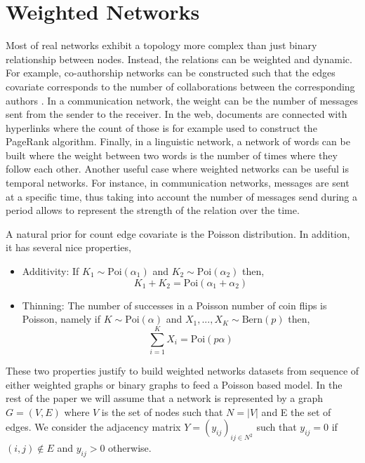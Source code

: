 \section{Weighted Networks}

Most of real networks exhibit a topology more complex than just binary relationship between nodes. Instead, the relations can be weighted and dynamic. For example, co-authorship networks can be constructed such that the edges covariate corresponds to the number of collaborations between the corresponding authors \cite{newman2001scientific}. In a communication network, the weight can be the number of messages sent from the sender to the receiver. In the web, documents are connected with hyperlinks where the count of those is for example used to construct the PageRank algorithm. Finally, in a linguistic network, a network of words can be built where the weight between two words is the number of times where they follow each other. Another useful case where weighted networks can be useful is temporal networks. For instance, in communication networks, messages are sent at a specific time, thus taking into account the number of messages send during a period allows to represent the strength of the relation over the time.


A natural prior for count edge covariate is the Poisson distribution. In addition, it has several nice properties,

\begin{itemize}
\item{Additivity}: If $K_1 \sim \mathrm{Poi}(\alpha_1)$ and $K_2 \sim \mathrm{Poi}(\alpha_2)$ then,
    \begin{equation*}
        K_1 + K_2 = \mathrm{Poi}(\alpha_1 + \alpha_2)
    \end{equation*}
\item {Thinning}: The number of successes in a Poisson number of coin flips is Poisson, namely if $K \sim \mathrm{Poi}(\alpha)$ and $X_1,...,X_K \sim \mathrm{Bern}(p)$ then,
    \begin{equation*}
        \sum_{i=1}^K X_i = \mathrm{Poi}(p\alpha)
    \end{equation*}
\end{itemize}

These two properties justify to build weighted networks datasets from sequence of either weighted graphs or binary graphs to feed a Poisson based model. In the rest of the paper we will assume that a network is represented by a graph $G=(V,E)$ where $V$ is the set of nodes such that $N=|V|$ and E the set of edges. We consider the adjacency matrix $Y=(y_{ij})_{ij\in N^2}$ such that $y_{ij}=0$ if $(i,j) \notin E$ and $y_{ij} > 0$ otherwise.

